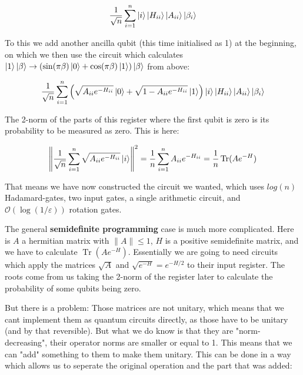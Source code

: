 \documentclass[11pt,a4paper]{scrartcl}
\DeclareMathOperator{\Tr}{Tr}
\begin{document}
\begin{equation*}
\frac{1}{\sqrt{n}}\sum_{i=1}^n\ket{i}\ket{H_{ii}}\ket{A_{ii}}\ket{\beta_i}
\end{equation*}

To this we add another ancilla qubit (this time initialised as 1) at the beginning, on which we then use the circuit which calculates $\ket{1}\ket{\beta}\to (\sin(\pi\beta)\ket{0}+\cos(\pi\beta)\ket{1})\ket{\beta}$ from above:

\begin{equation*}
\frac{1}{\sqrt{n}}\sum_{i=1}^n\left(\sqrt{A_{ii}e^{-H_{ii}}}\ket{0}+\sqrt{1-A_{ii}e^{-H_{ii}}}\ket{1}\right)\ket{i}\ket{H_{ii}}\ket{A_{ii}}\ket{\beta_i}
\end{equation*}

The 2-norm of the parts of this register where the first qubit is zero is its probability to be measured as zero. This is here:

\begin{equation*}
\left\|\frac{1}{\sqrt{n}}\sum_{i=1}^n\sqrt{A_{ii}e^{-H_{ii}}}\ket{i}\right\|^2=\frac{1}{n}\sum_{i=1}^n A_{ii}e^{-H_{ii}}=\frac{1}{n}\Tr(Ae^{-H})
\end{equation*}

That means we have now constructed the circuit we wanted, which uses $log(n)$ Hadamard-gates, two input gates, a single arithmetic circuit, and $\mathcal{O}(\log(1/\varepsilon))$ rotation gates. %


\vspace{1cm}

The general \textbf{semidefinite programming} case is much more complicated. Here is $A$ a hermitian matrix with $\|A\|\leq 1$, $H$ is a positive semidefinite matrix, and we have to calculate $\Tr(Ae^{-H})$. Essentially we are going to need circuits which apply the matrices $\sqrt{A}$ and $\sqrt{e^{-H}}=e^{-H/2}$ to their input register. The roots come from us taking the 2-norm of the register later to calculate the probability of some qubits being zero.

But there is a problem: Those matrices are not unitary, which means that we cant implement them as quantum circuits directly, as those have to be unitary (and by that reversible). But what we do know is that they are "norm-decreasing", their operator norms are smaller or equal to 1. This means that we can "add" something to them to make them unitary. This can be done in a way which allows us to seperate the original operation and the part that was added:
\end{document}
